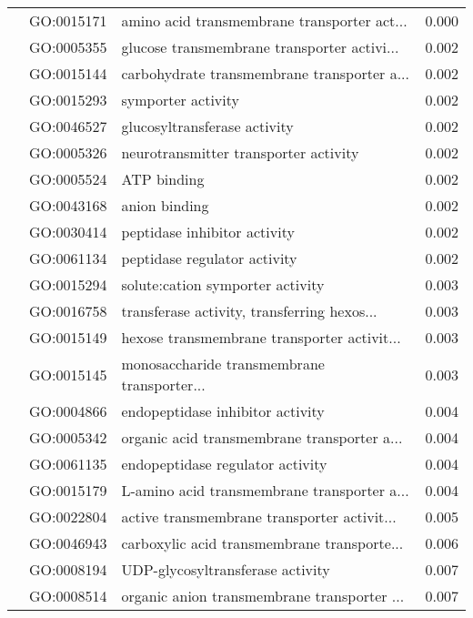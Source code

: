 \begin{longtable}{lllr}
   & GO:0015171 &  amino acid transmembrane transporter act... &         0.000 \\
   & GO:0005355 &  glucose transmembrane transporter activi... &         0.002 \\
   & GO:0015144 &  carbohydrate transmembrane transporter a... &         0.002 \\
   & GO:0015293 &                           symporter activity &         0.002 \\
   & GO:0046527 &                 glucosyltransferase activity &         0.002 \\
   & GO:0005326 &        neurotransmitter transporter activity &         0.002 \\
   & GO:0005524 &                                  ATP binding &         0.002 \\
   & GO:0043168 &                                anion binding &         0.002 \\
   & GO:0030414 &                 peptidase inhibitor activity &         0.002 \\
   & GO:0061134 &                 peptidase regulator activity &         0.002 \\
   & GO:0015294 &             solute:cation symporter activity &         0.003 \\
   & GO:0016758 &  transferase activity, transferring hexos... &         0.003 \\
   & GO:0015149 &  hexose transmembrane transporter activit... &         0.003 \\
   & GO:0015145 &  monosaccharide transmembrane transporter... &         0.003 \\
   & GO:0004866 &             endopeptidase inhibitor activity &         0.004 \\
   & GO:0005342 &  organic acid transmembrane transporter a... &         0.004 \\
   & GO:0061135 &             endopeptidase regulator activity &         0.004 \\
   & GO:0015179 &  L-amino acid transmembrane transporter a... &         0.004 \\
   & GO:0022804 &  active transmembrane transporter activit... &         0.005 \\
   & GO:0046943 &  carboxylic acid transmembrane transporte... &         0.006 \\
   & GO:0008194 &             UDP-glycosyltransferase activity &         0.007 \\
   & GO:0008514 &  organic anion transmembrane transporter ... &         0.007 \\

\end{longtable}
